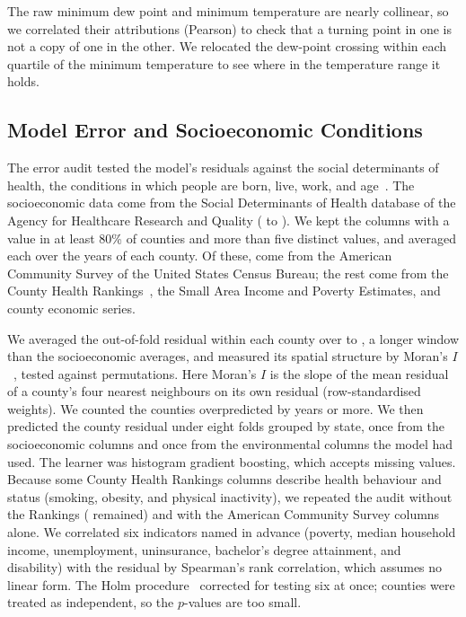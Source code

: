 \documentclass[sensors,article,submit,moreauthors,pdftex]{Definitions/mdpi}
\begin{document}
The raw minimum dew point and minimum
temperature are nearly collinear, so we correlated their attributions (Pearson) to check
that a turning point in one is not a copy of one in the other. We
relocated the dew-point crossing within each quartile of the minimum
temperature to see where in the temperature range it holds.

\subsection{Model Error and Socioeconomic Conditions}
\label{ssec:m_sdoh}
The error audit tested the model's residuals against the social determinants of health, the
conditions in which people are born, live, work, and age~\cite{Marmot2008}. The socioeconomic data
come from the Social Determinants of Health database of the Agency for
Healthcare Research and Quality (\ResSdohYearLo{} to \ResSdohYearHi{}). We kept the \ResSdohN{}
columns with a value in at least 80\% of counties and more than five distinct
values, and averaged each over the years of each county. Of these, \ResAcsN{}
come from the American Community Survey of the United States Census Bureau;
the rest come from the County Health Rankings~\cite{Remington2015}, the Small
Area Income and Poverty Estimates, and county economic series.

We averaged the out-of-fold residual within each county over \YearStart{} to
\YearEnd{}, a longer window than the socioeconomic averages, and measured its
spatial structure by Moran's $I$~\cite{Moran1950}, tested against
\MoranPerm{} permutations. Here Moran's $I$ is the slope of the mean residual
of a county's four nearest neighbours on its own residual (row-standardised
weights). We counted the counties overpredicted by \ResMissYears{} years or more. We then predicted the county residual under eight folds grouped by
state, once from the \ResSdohN{} socioeconomic columns and once from the
\ResEnvN{} environmental columns the model had used. The learner was histogram
gradient boosting, which accepts missing values. Because some County Health
Rankings columns describe health behaviour and status (smoking, obesity, and
physical inactivity), we repeated the audit without the Rankings (\ResNoChrN{} remained)
and with the American Community Survey columns alone. We correlated six
indicators named in advance (poverty, median household income, unemployment,
uninsurance, bachelor's degree attainment, and disability) with the residual
by Spearman's rank correlation, which assumes no linear form. The Holm
procedure~\cite{Holm1979} corrected for testing six at once; counties were treated
as independent, so the $p$-values are too small.
\end{document}
